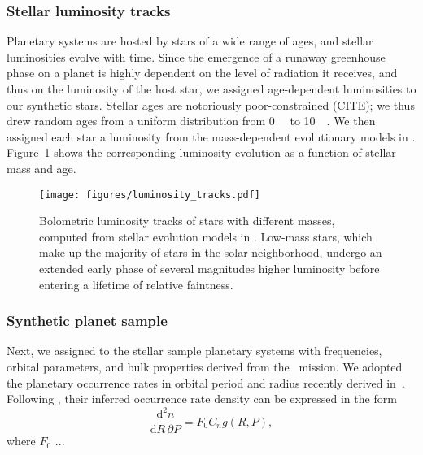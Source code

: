 \documentclass[modern]{aastex631}
\begin{document}
\subsubsection{Stellar luminosity tracks}
    Planetary systems are hosted by stars of a wide range of ages, and stellar luminosities evolve with time.
    Since the emergence of a runaway greenhouse phase on a planet is highly dependent on the level of radiation it receives, and thus on the luminosity of the host star, we assigned age-dependent luminosities to our synthetic stars.
    Stellar ages are notoriously poor-constrained (CITE); we thus drew random ages from a uniform distribution from \SI{0}{\giga\year} to \SI{10}{\giga\year}.
    We then assigned each star a luminosity from the mass-dependent evolutionary models in \citet{Baraffe1998}.
    Figure~\ref{fig:luminosity_tracks} shows the corresponding luminosity evolution as a function of stellar mass and age.
\begin{figure}[ht!]
    \begin{centering}
        \texttt{[image: figures/luminosity\_tracks.pdf]}
        \caption{
            Bolometric luminosity tracks of stars with different masses, computed from stellar evolution models in \citet{Baraffe1998}.
            Low-mass stars, which make up the majority of stars in the solar neighborhood, undergo an extended early phase of several magnitudes higher luminosity before entering a lifetime of relative faintness.
        }
        \label{fig:luminosity_tracks}
    \end{centering}
\end{figure}


\subsubsection{Synthetic planet sample}\label{sec:syn_planets}
Next, we assigned to the stellar sample planetary systems with frequencies, orbital parameters, and bulk properties derived from the \kepler\ mission.
We adopted the planetary occurrence rates in orbital period and radius recently derived in~\citep{Bergsten2022}.
Following \citep{Youdin2011a}, their inferred occurrence rate density can be expressed in the form
\begin{equation}
    \frac{\mathrm{d}^2n}{\mathrm{d}R \, \partial P} = F_0 C_n g(R, P),
\end{equation}
where $F_0$
...
\end{document}
